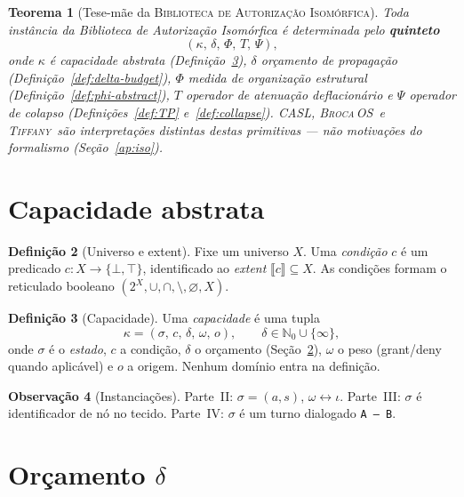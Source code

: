 \documentclass[11pt]{article}
\newcommand{\SO}{\textsc{Broca\,OS}}
\newcommand{\Tiffany}{\textsc{Tiffany}}
\newcommand{\BAI}{\textsc{Biblioteca de Autorização Isomórfica}}
\newtheorem{theorem}{Teorema}
\theoremstyle{definition}
\newtheorem{definition}[theorem]{Definição}
\newtheorem{remark}[theorem]{Observação}
\newcommand{\ext}[1]{\llbracket #1 \rrbracket}
\newcommand{\dep}{\delta}
\newcommand{\NN}{\mathbb{N}_0}
\newcommand{\Phif}{\Phi}
\begin{document}
\begin{theorem}[Tese-mãe da \BAI]\label{thm:mae}
Toda instância da \emph{Biblioteca de Autorização Isomórfica} é determinada
pelo \textbf{quinteto}
\[
  (\kappa,\,\dep,\,\Phif,\,T,\,\Psi),
\]
onde $\kappa$ é capacidade abstrata (Definição~\ref{def:kappa-abstract}),
$\dep$ orçamento de propagação (Definição~\ref{def:delta-budget}),
$\Phif$ medida de organização estrutural (Definição~\ref{def:phi-abstract}),
$T$ operador de atenuação deflacionário e $\Psi$ operador de colapso
(Definições~\ref{def:TP} e~\ref{def:collapse}). CASL, \SO\ e \Tiffany\
são \emph{interpretações} distintas destas primitivas --- não motivações
do formalismo (Seção~\ref{ap:iso}).
\end{theorem}

\section{Capacidade abstrata}\label{sec:kappa}

\begin{definition}[Universo e extent]\label{def:universo}
Fixe um universo $X$. Uma \emph{condição} $c$ é um predicado
$c:X\to\{\bot,\top\}$, identificado ao \emph{extent}
$\ext{c}\subseteq X$. As condições formam o reticulado booleano
$(2^X,\cup,\cap,\setminus,\varnothing,X)$.
\end{definition}

\begin{definition}[Capacidade]\label{def:kappa-abstract}
Uma \emph{capacidade} é uma tupla
\[
  \kappa=(\sigma,\,c,\,\dep,\,\omega,\,o),
  \qquad \dep\in\NN\cup\{\infty\},
\]
onde $\sigma$ é o \emph{estado}, $c$ a condição,
$\dep$ o orçamento (Seção~\ref{sec:delta}), $\omega$ o peso
(grant/deny quando aplicável) e $o$ a origem. Nenhum domínio entra na
definição.
\end{definition}

\begin{remark}[Instanciações]\label{rem:instancias}
Parte~II: $\sigma=(a,s)$, $\omega\leftrightarrow\iota$. Parte~III: $\sigma$
é identificador de nó no tecido. Parte~IV: $\sigma$ é um turno dialogado
\texttt{A — B}.
\end{remark}

\section{Orçamento $\dep$}\label{sec:delta}
\end{document}
